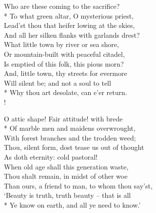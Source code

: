 Who are these coming to the sacrifice?\\*
\vin To what green altar, O mysterious priest,\\
Lead'st thou that heifer lowing at the skies,\\
\vin And all her silken flanks with garlands drest?\\
What little town by river or sea shore,\\
\vin Or mountain-built with peaceful citadel,\\
\vin \vin Is emptied of this folk, this pious morn?\\
And, little town, thy streets for evermore\\
\vin Will silent be; and not a soul to tell\\*
\vin \vin Why thou art desolate, can e'er return.\\!

O attic shape! Fair attitude! with brede\\*
\vin Of marble men and maidens overwrought,\\
With forest branches and the trodden weed;\\
\vin Thou, silent form, dost tease us out of thought\\
As doth eternity: cold pastoral!\\
\vin When old age shall this generation waste,\\
\vin \vin Thou shalt remain, in midst of other woe\\
Than ours, a friend to man, to whom thou say'st,\\
\vin `Beauty is truth, truth beauty -- that is all\\*
\vin \vin Ye know on earth, and all ye need to know.'
